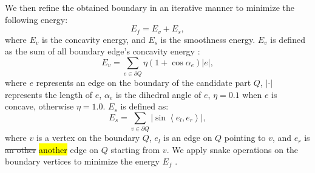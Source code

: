 We then refine the obtained boundary in an iterative manner to minimize the following energy:
$$
E_{f}=E_{v}+E_{s},
$$
where $E_{v}$ is the concavity energy, and $E_{s}$ is the smoothness energy. $E_{v}$ is defined as the sum of all boundary edge's concavity energy \cite{hierarchicalmeshdecompositionayellettog2003}:
$$
E_{v}=\sum_{e\in \partial Q}\eta(1+\cos\alpha_{e})|e|,
$$
where $e$ represents an edge on the boundary of the candidate part $Q$, $\left| \cdot \right|$ represents the length of $e$, $\alpha_{e}$ is the dihedral angle of $e$, $\eta=0.1$ when $e$ is concave, otherwise $\eta=1.0$.
$E_{s}$ is defined as:
\[{E_s} = \sum\limits_{v \in \partial Q} {\left| {\sin\left\langle {{e_l},{e_r}} \right\rangle } \right|},\]
where $v$ is a vertex on the boundary $Q$, $e_l$ is an edge on $Q$ pointing to $v$, and $e_r$ is \st{an other} \hl{another} edge on $Q$ starting from $v$. We apply snake operations on the boundary vertices to minimize the energy $E_{f}$ \cite{CGF:CGF947}.
